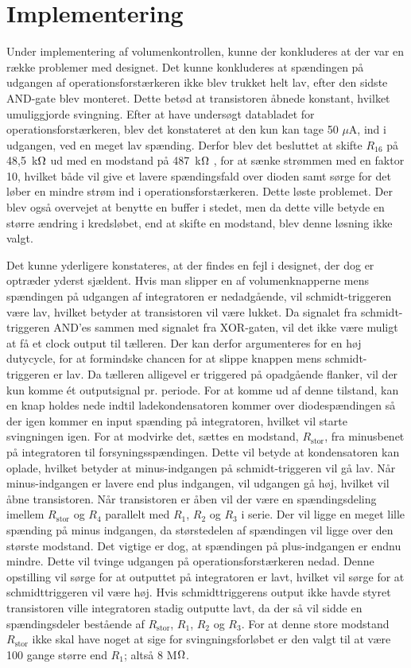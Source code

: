 \section{Implementering}
Under implementering af volumenkontrollen, kunne der konkluderes at der var en række problemer med designet. Det kunne konkluderes at spændingen på udgangen af operationsforstærkeren ikke blev trukket helt lav, efter den sidste AND-gate blev monteret. Dette betød at transistoren åbnede konstant, hvilket umuliggjorde svingning. Efter at have undersøgt databladet for operationsforstærkeren, blev det konstateret at den kun kan tage 50 $\mu$A, ind i udgangen, ved en meget lav spænding. Derfor blev det besluttet at skifte $R_{16}$ på 48,5~k$\ohm$ ud med en modstand på 487~k$\ohm$ , for at sænke strømmen med en faktor 10, hvilket både vil give et lavere spændingsfald over dioden samt sørge for det løber en mindre strøm ind i operationsforstærkeren. Dette løste problemet. Der blev også overvejet at benytte en buffer i stedet, men da dette ville betyde en større ændring i kredsløbet, end at skifte en modstand, blev denne løsning ikke valgt.

Det kunne yderligere konstateres, at der findes en fejl i designet, der dog er optræder yderst sjældent. Hvis man slipper en af volumenknapperne  mens spændingen på udgangen af integratoren er nedadgående, vil schmidt-triggeren være lav, hvilket betyder at transistoren vil være lukket. Da signalet fra schmidt-triggeren AND'es sammen med signalet fra XOR-gaten, vil det ikke være muligt at få et clock output til tælleren. Der kan derfor argumenteres for en høj dutycycle, for at formindske chancen for at slippe knappen mens schmidt-triggeren er lav. Da tælleren alligevel er triggered på opadgående flanker, vil der kun komme ét outputsignal pr. periode. For at komme ud af denne tilstand, kan en knap holdes nede indtil ladekondensatoren kommer over diodespændingen så der igen kommer en input spænding på integratoren, hvilket vil starte svingningen igen. 
For at modvirke det, sættes en modstand, $R_{\mathrm{stor}}$, fra minusbenet på integratoren til forsyningsspændingen. Dette vil betyde at kondensatoren kan oplade, hvilket betyder at minus-indgangen på schmidt-triggeren vil gå lav. Når minus-indgangen er lavere end plus indgangen, vil udgangen gå høj, hvilket vil åbne transistoren. Når transistoren er åben vil der være en spændingsdeling imellem $R_{\mathrm{stor}}$ og $R_4$ parallelt med $R_1$, $R_2$ og $R_3$ i serie. Der vil ligge en meget lille spænding på minus indgangen, da størstedelen af spændingen vil ligge over den største modstand. Det vigtige er dog, at spændingen på plus-indgangen er endnu mindre. Dette vil tvinge udgangen på operationsforstærkeren nedad. Denne opstilling vil sørge for at outputtet på integratoren er lavt, hvilket vil sørge for at schmidttriggeren vil være høj. Hvis schmidttriggerens output ikke havde styret transistoren ville integratoren stadig outputte lavt, da der så vil sidde en spændingsdeler bestående af $R_{\mathrm{stor}}$, $R_1$, $R_2$ og $R_3$.
For at denne store modstand $R_{\mathrm{stor}}$ ikke skal have noget at sige for svingningsforløbet er den valgt til at være 100 gange større end $R_1$; altså 8 M$\ohm$.


